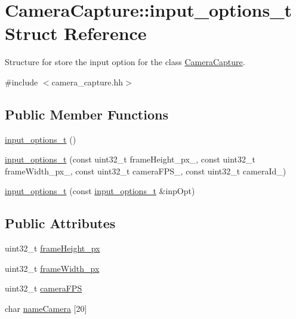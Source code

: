 \hypertarget{struct_camera_capture_1_1input__options__t}{}\section{Camera\+Capture\+::input\+\_\+options\+\_\+t Struct Reference}
\label{struct_camera_capture_1_1input__options__t}


Structure for store the input option for the class \mbox{\hyperlink{class_camera_capture}{Camera\+Capture}}.  




{\ttfamily \#include $<$camera\+\_\+capture.\+hh$>$}

\subsection*{Public Member Functions}
\begin{DoxyCompactItemize}
\item 
\mbox{\hyperlink{struct_camera_capture_1_1input__options__t_a1e74abe6a5246461224f73fa8173f708}{input\+\_\+options\+\_\+t}} ()
\item 
\mbox{\hyperlink{struct_camera_capture_1_1input__options__t_abe7b3c94b1390d282fbcb3f96e04851a}{input\+\_\+options\+\_\+t}} (const uint32\+\_\+t frame\+Height\+\_\+px\+\_\+, const uint32\+\_\+t frame\+Width\+\_\+px\+\_\+, const uint32\+\_\+t camera\+F\+P\+S\+\_\+, const uint32\+\_\+t camera\+Id\+\_\+)
\item 
\mbox{\hyperlink{struct_camera_capture_1_1input__options__t_a1259e762bcfd6b46f3377e0b9cd21776}{input\+\_\+options\+\_\+t}} (const \mbox{\hyperlink{struct_camera_capture_1_1input__options__t}{input\+\_\+options\+\_\+t}} \&inp\+Opt)
\end{DoxyCompactItemize}
\subsection*{Public Attributes}
\begin{DoxyCompactItemize}
\item 
uint32\+\_\+t \mbox{\hyperlink{struct_camera_capture_1_1input__options__t_aee1ab45b4ec0cbebc0a548f0e0b9ab18}{frame\+Height\+\_\+px}}
\item 
uint32\+\_\+t \mbox{\hyperlink{struct_camera_capture_1_1input__options__t_a0b6cfab2f45deab8a4eb56d570385d8a}{frame\+Width\+\_\+px}}
\item 
uint32\+\_\+t \mbox{\hyperlink{struct_camera_capture_1_1input__options__t_a9b6b0e8db75c3ac41ba4e6f757bb3e96}{camera\+F\+PS}}
\item 
char \mbox{\hyperlink{struct_camera_capture_1_1input__options__t_a2208ed63892eef8ea7f2a663c103792c}{name\+Camera}} \mbox{[}20\mbox{]}
\end{DoxyCompactItemize}


